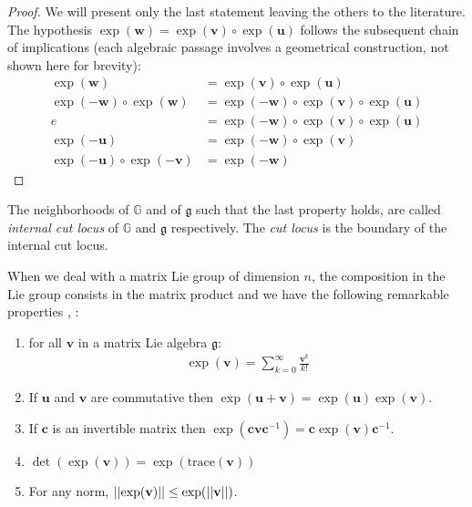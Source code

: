\begin{proof}
	We will present only the last statement leaving the others to the literature. The hypothesis $\exp(\mathbf{w}) = \exp(\mathbf{v}) \circ \exp(\mathbf{u})$ follows the subsequent chain of implications (each algebraic passage involves a geometrical construction, not shown here for brevity):
	\begin{align*}
		\exp(\mathbf{w}) &= \exp(\mathbf{v}) \circ \exp(\mathbf{u}) \\
		\exp(-\mathbf{w}) \circ \exp(\mathbf{w}) &= \exp(-\mathbf{w}) \circ\exp(\mathbf{v}) \circ \exp(\mathbf{u}) \\
		e &= \exp(-\mathbf{w}) \circ\exp(\mathbf{v}) \circ \exp(\mathbf{u}) \\
		\exp(-\mathbf{u})  &= \exp(-\mathbf{w}) \circ\exp(\mathbf{v})  \\
		\exp(-\mathbf{u}) \circ\exp(-\mathbf{v})  &= \exp(-\mathbf{w})  
	\end{align*}
\end{proof}
The neighborhoods of $\mathbb{G}$ and of $\mathfrak{g}$ such that the last property holds, are called \emph{internal cut locus} of $\mathbb{G}$ and $\mathfrak{g}$ respectively. The \emph{cut locus} is the boundary of the internal cut locus.

When we deal with a matrix Lie group of dimension $n$, the composition in the Lie group consists in the matrix product and we have the following remarkable properties \cite{hall2015lie}, \cite{kirillov2008introduction}:
\begin{enumerate}
	\item for all $\mathbf{v}$ in a matrix Lie algebra $\mathfrak{g}$:
	\begin{align}\label{eq:exp_as_inf_sum}
	\exp(\mathbf{v}) = \sum_{k=0}^{\infty} \frac{\mathbf{v}^{k}}{k!}
	\end{align}
	\item If $\mathbf{u}$ and $\mathbf{v}$ are commutative then $\exp(\mathbf{u} + \mathbf{v}) = \exp(\mathbf{u})\exp(\mathbf{v})$.
	\item If $\mathbf{c}$ is an invertible matrix then $\exp(\mathbf{c}\mathbf{v}\mathbf{c}^{-1}) = \mathbf{c}\exp(\mathbf{v})\mathbf{c}^{-1}$.
	\item $\det(\exp(\mathbf{v})) = \exp(\text{trace}(\mathbf{v}))$
	\item For any norm, $\vert\lvert \exp(\mathbf{v}) \rvert\vert \leq \exp(\vert\lvert \mathbf{v} \rvert\vert)$.
\end{enumerate}

